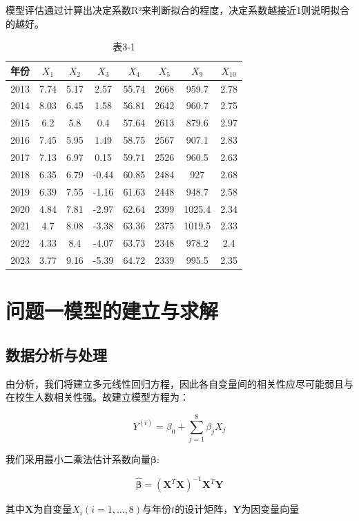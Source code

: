 \documentclass[UTF8, zihao=-4]{ctexart}
\begin{document}
	模型评估通过计算出决定系数R²来判断拟合的程度，决定系数越接近1则说明拟合的越好。
\begin{table}[H]
	\centering
	\begin{tabular}{@{}r c c c c c c c@{}}
		\toprule
		年份 & $X_1$ & $X_2$ & $X_3$ & $X_4$ & $X_5$ & $X_9$ & $X_{10}$ \\
		\midrule
		2013 & 7.74  & 5.17  & 2.57  & 55.74 & 2668  & 959.7 & 2.78  \\
		2014 & 8.03  & 6.45  & 1.58  & 56.81 & 2642  & 960.7 & 2.75  \\
		2015 & 6.2   & 5.8   & 0.4   & 57.64 & 2613  & 879.6 & 2.97  \\
		2016 & 7.45  & 5.95  & 1.49  & 58.75 & 2567  & 907.1 & 2.83  \\
		2017 & 7.13  & 6.97  & 0.15  & 59.71 & 2526  & 960.5 & 2.63  \\
		2018 & 6.35  & 6.79  & -0.44 & 60.85 & 2484  & 927   & 2.68  \\
		2019 & 6.39  & 7.55  & -1.16 & 61.63 & 2448  & 948.7 & 2.58  \\
		2020 & 4.84  & 7.81  & -2.97 & 62.64 & 2399  & 1025.4 & 2.34  \\
		2021 & 4.7   & 8.08  & -3.38 & 63.36 & 2375  & 1019.5 & 2.33  \\
		2022 & 4.33  & 8.4   & -4.07 & 63.73 & 2348  & 978.2 & 2.4   \\
		2023 & 3.77  & 9.16  & -5.39 & 64.72 & 2339  & 995.5 & 2.35  \\
		\bottomrule
	\end{tabular}
	\caption{表3-1}
\end{table}
	
	\section{问题一模型的建立与求解}
	\subsection{数据分析与处理}
		由分析，我们将建立多元线性回归方程，因此各自变量间的相关性应尽可能弱且与在校生人数相关性强。故建立模型方程为：
		
		\[
		Y^{(i)} = \beta_0 + \sum_{j=1}^{8}\beta_jX_j
		\]
		
		我们采用最小二乘法估计系数向量$\bm{\beta}$:
		
		\[
		\hat{\bm{\beta}} = (\bm{X}^T\bm{X})^{-1}\bm{X}^T\textbf{Y}
		\]
		
		其中$\bm{X}$为自变量$X_i(i=1,...,8)$与年份$t$的设计矩阵，$\bm{Y}$为因变量向量
		
\end{document}
